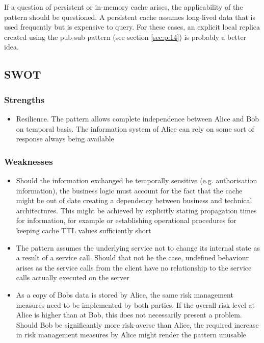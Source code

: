 \documentclass[10pt,a4paper]{article}
\begin{document}
If a question of persistent or in-memory cache arises, the applicability of the pattern should be questioned. A persistent cache assumes long-lived data that is used frequently but is expensive to query. For these cases, an explicit local replica created using the pub-sub pattern (see section \ref{sec:p:14}) is probably a better idea.

\subsection{SWOT}
\subsubsection{Strengths}
	\begin{itemize}
 		\item Resilience. The pattern allows complete independence between Alice and Bob on temporal basis. The information system of Alice can rely on some sort of response always being available  
	\end{itemize}
	
\subsubsection{Weaknesses}	
	 	\begin{itemize}
			\item Should the information exchanged be temporally sensitive (e.g. authorisation information), the business logic must account for the fact that the cache might be out of date creating a dependency between business and technical architectures. This might be achieved by explicitly stating propagation times for information, for example or establishing operational procedures for keeping cache TTL values sufficiently short 
			\item The pattern assumes the underlying service not to change its internal state as a result of a service call. Should that not be the case, undefined behaviour arises as the service calls from the client have no relationship to the service calls actually executed on the server
			\item As a copy of Bobs data is stored by Alice, the same risk management measures need to be implemented by both parties. If the overall risk level at Alice is higher than at Bob, this does not necessarily present a problem. Should Bob be significantly more risk-averse than Alice, the required increase in risk management measures by Alice might render the pattern unusable
		\end{itemize}
\end{document}
